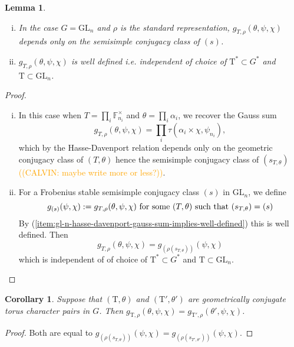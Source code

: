 \documentclass[12pt, reqno]{amsart}
\newtheorem{lemma}[theorem]{Lemma}
\newtheorem{corollary}[theorem]{Corollary}
\theoremstyle{definition}
\theoremstyle{definition}
\theoremstyle{definition}
\newcommand{\multiplicativegroup}[1]{#1^{\times}}
\newcommand{\fieldCharacter}{\psi}
\newcommand{\GL}{\mathrm{GL}}
\newcommand{\finiteField}{\mathbb{F}}
\newcommand{\finiteFieldExtension}[1]{\finiteField_{#1}}
\newcommand{\algebraicGroup}[1]{\boldsymbol{\mathrm{#1}}}
\newcommand{\calvin}[1]{\textcolor{orange}{\sffamily ((CALVIN: #1))}}
\begin{document}
\begin{lemma}
\label{lemma:gl_invariance}
\begin{enumerate}[(i)]
	\item \label{item:gl-n-hasse-davenport-gauss-sum-implies-well-defined} In the case $G = \GL_n$ and $\rho$ is the standard representation, $g_{T,\rho}(\theta,\psi,\chi)$ depends only on the semisimple conjugacy class of $(s)$.
	\item $g_{T,\rho}(\theta,\psi,\chi)$ is well defined i.e. independent of choice of $\algebraicGroup{T}^* \subset G^*$ and $\algebraicGroup{T} \subset \GL_n$.
\end{enumerate}
\end{lemma}
\begin{proof}
\begin{enumerate}[(i)]
	\item In this case when $T = \prod_{i} \multiplicativegroup{\finiteFieldExtension{n_i}}$ and $\theta = \prod_{i} \alpha_i$, we recover the Gauss sum
	\[
	g_{T,\rho}(\theta,\psi,\chi)  = \prod_i \tau(\alpha_i \times \chi, \fieldCharacter_{n_i}),
	\]
	which by the Hasse-Davenport relation depends only on the geometric conjugacy class of $(T,\theta)$ hence the semisimple conjugacy class of $(s_{T,\theta})$ \calvin{maybe write more or less?}. 
	\item For a Frobenius stable semisimple conjugacy class $(s)$ in $\GL_n$, we define
	\[
	g_{(s)}(\psi,\chi) := g_{T,\rho}(\theta,\psi,\chi) \textnormal{ for some } (T,\theta) \textnormal{ such that } (s_{T,\theta}) = (s)
	\]
	By (\ref{item:gl-n-hasse-davenport-gauss-sum-implies-well-defined}) this is well defined. Then
	\[
	g_{T,\rho}(\theta,\psi,\chi)  = g_{(\rho(s_{T,\theta}))}(\psi,\chi)
	\]
	which is independent of of choice of $\algebraicGroup{T}^* \subset G^*$ and $\algebraicGroup{T} \subset \GL_n$.
\end{enumerate}
\end{proof}

\begin{corollary}
\label{cor:geoconj}
Suppose that $(\algebraicGroup{T},\theta)$ and $(\algebraicGroup{T}',\theta')$ are geometrically conjugate torus character pairs in $G$. Then $g_{\algebraicGroup{T},\rho}(\theta,\psi,\chi) = g_{\algebraicGroup{T}',\rho}(\theta',\psi,\chi)$.
\end{corollary}
\begin{proof}
Both are equal to $g_{(\rho(s_{T,\theta}))}(\psi,\chi) = g_{(\rho(s_{T',\theta'}))}(\psi,\chi)$.
\end{proof}
\end{document}
